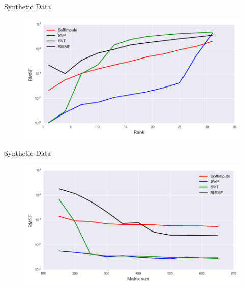 \documentclass{beamer}
\begin{document}
\begin{frame}{Synthetic Data}
	\begin{figure}[h]
		\centering
		\includegraphics[width=1\linewidth]{./../results/synthetic/exper_2/synthetic_rank_rmse.png}
		\label{heat_map}
	\end{figure}
\end{frame}
\begin{frame}{Synthetic Data}
	\begin{figure}[h]
		\centering
		\includegraphics[width=1\linewidth]{./../results/synthetic/exper_3/synthetic_size_rmse.png}
		\label{heat_map}
	\end{figure}
\end{frame}
\end{document}
